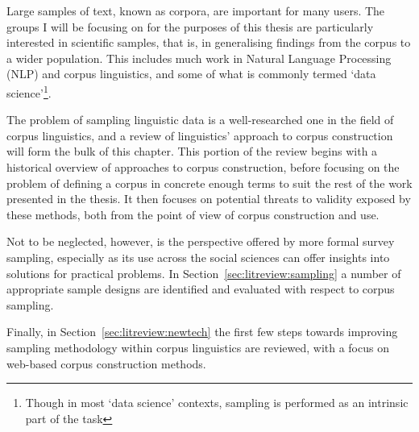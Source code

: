 Large samples of text, known as corpora, are important for many users.  The groups I will be focusing on for the purposes of this thesis are particularly interested in scientific samples, that is, in generalising findings from the corpus to a wider population.  This includes much work in Natural Language Processing (NLP) and corpus linguistics, and some of what is commonly termed `data science'\footnote{Though in most `data science' contexts, sampling is performed as an intrinsic part of the task}.


The problem of sampling linguistic data is a well-researched one in the field of corpus linguistics, and a review of linguistics' approach to corpus construction will form the bulk of this chapter.  This portion of the review begins with a historical overview of approaches to corpus construction, before focusing on the problem of defining a corpus in concrete enough terms to suit the rest of the work presented in the thesis.  It then focuses on potential threats to validity exposed by these methods, both from the point of view of corpus construction and use.

Not to be neglected, however, is the perspective offered by more formal survey sampling, especially as its use across the social sciences can offer insights into solutions for practical problems.  In Section~\ref{sec:litreview:sampling} a number of appropriate sample designs are identified and evaluated with respect to corpus sampling.

Finally, in Section~\ref{sec:litreview:newtech} the first few steps towards improving sampling methodology within corpus linguistics are reviewed, with a focus on web-based corpus construction methods.

